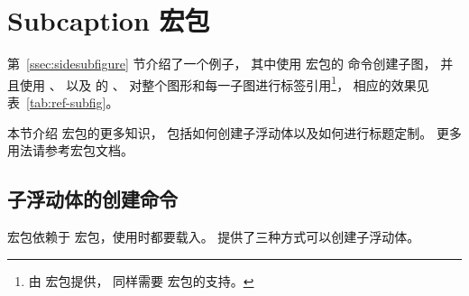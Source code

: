 \section{Subcaption 宏包}\label{sec:subcaption-pkg}

第~\ref{ssec:sidesubfigure} 节介绍了一个例子，
其中使用  宏包的  命令创建子图，
并且使用 、 以及  的 、 对整个图形和每一子图进行标签引用\footnote{
	 由  宏包提供， 同样需要  宏包的支持。}，
相应的效果见表~\ref{tab:ref-subfig}。

本节介绍  宏包的更多知识，
包括如何创建子浮动体以及如何进行标题定制。
更多用法请参考宏包文档\cite{subcaption-doc}。

\subsection{子浮动体的创建命令}

 宏包依赖于  宏包，使用时都要载入。
 提供了三种方式可以创建子浮动体。

